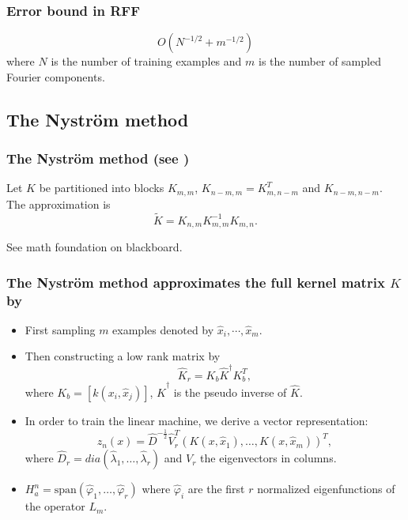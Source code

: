 \begin{frame}
  \frametitle{Error bound in RFF}

\begin{equation}
  O(N^{-1/2} + m^{-1/2})
\end{equation}  
where $N$ is the number of training examples and 
$m$ is the number of sampled Fourier components.

\end{frame}

\subsection{The Nyström method}

\begin{frame}
  \frametitle{The Nyström method (see \cite{NystromMethodToSpeedUpKernelMachines})}

  Let $K$ be partitioned into blocks 
  $K_{m,m}$, $K_{n-m,m} = K^T_{m,n-m}$ and 
  $K_{n-m,n-m}$. 
  The approximation is 
  \begin{equation}
    \tilde K
    = 
    K_{n, m}
    K_{m,m}^{-1}
    K_{m,n}.
  \end{equation}

  See math foundation on blackboard. 

\end{frame}

\begin{frame}
  \frametitle{The Nyström method approximates the full kernel matrix $K$ by}

  \begin{itemize}
    \item First sampling $m$ examples denoted by
    $\hat x_i, \cdots,\hat x_m$. 
    \item Then constructing a low rank matrix by  
    \begin{equation}
      \hat{K}_r
      = 
      K_b 
      \hat{K}^\dagger 
      K_b^T, 
    \end{equation}
    where $K_b = \left[k(x_i, \hat x_j)\right]$,
    $\hat{K}^\dagger$ is the pseudo inverse of $\hat{K}$. 

    \item In order to train the linear machine, we derive a vector representation: 
    \begin{equation}
      z_n(x)
      = 
      \hat{D}^{-\frac{1}{2}} \hat V_r^T 
      \left(
        K(x,\hat{x}_1),
        \ldots,
        K(x,\hat{x}_m)
        \right)^T,
    \end{equation}
    where $\hat D_r = dia(\hat \lambda_1, \ldots, \hat \lambda_r)$ and $V_r$ the eigenvectors in columns. 
    \item $H^n_a = \text{span}(\hat \varphi_1, \ldots, \hat \varphi_r)$ where $\hat \varphi_i$ are the first $r$ normalized eigenfunctions of the operator $L_m$. 
  \end{itemize}
\end{frame}

